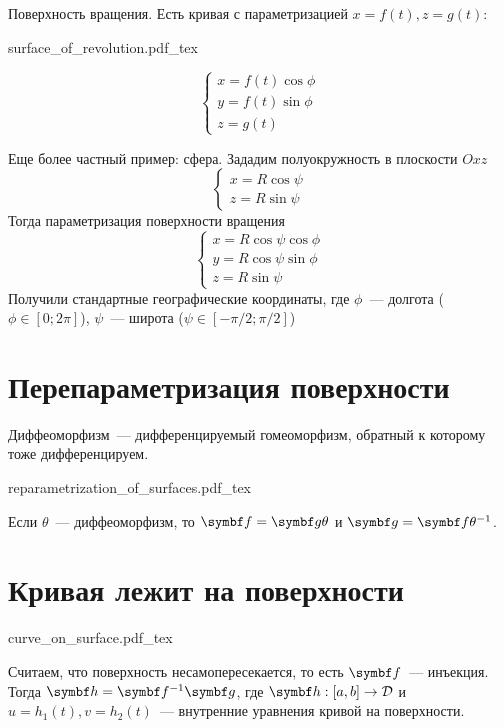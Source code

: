 \documentclass[main]{subfiles}
\begin{document}
\begin{example}
    Поверхность вращения.
    Есть кривая с параметризацией $x = f(t), z = g(t)$:

    \begin{minipage}{0.59\textwidth}
        {surface_of_revolution.pdf_tex}
    \end{minipage}
    \begin{minipage}{0.35\textwidth}
        \[\begin{cases}
                x = f(t) \cos \phi \\
                y = f(t) \sin \phi \\
                z = g(t)
            \end{cases}\]
    \end{minipage}
\end{example}
\begin{example}
    Еще более частный пример: сфера.
    Зададим полуокружность в плоскости $Oxz$
    \[\begin{cases}
            x = R \cos \psi \\
            z = R \sin \psi
        \end{cases}\]
    Тогда параметризация поверхности вращения
    \[\begin{cases}
            x = R \cos \psi \cos \phi \\
            y = R \cos \psi \sin \phi \\
            z = R \sin \psi
        \end{cases}\]
    Получили стандартные географические координаты, где
    $\phi$~--- долгота ($\phi \in [0;2 \pi]$), $\psi$~--- широта ($\psi \in [-\pi/2 ; \pi/2]$)
\end{example}

\section{Перепараметризация поверхности}
\begin{definition}[Диффеоморфизм]
    Диффеоморфизм~--- дифференцируемый гомеоморфизм, обратный к которому тоже дифференцируем.
\end{definition}
\begin{center}
    {reparametrization_of_surfaces.pdf_tex}
\end{center}
Если $\theta$~--- диффеоморфизм, то $\vf = \vg \theta$ и $\vg = \vf \theta^{-1}$.

\section{Кривая лежит на поверхности}
\begin{center}
    {curve_on_surface.pdf_tex}
\end{center}
Считаем, что поверхность несамопересекается, то есть $\vf$~--- инъекция.
Тогда $\vh = \vf^{-1}\vg$, где $\vh: [a,b] \to \fancyD$ и $u = h_1(t), v = h_2(t)$~--- внутренние уравнения кривой на поверхности.
\end{document}

